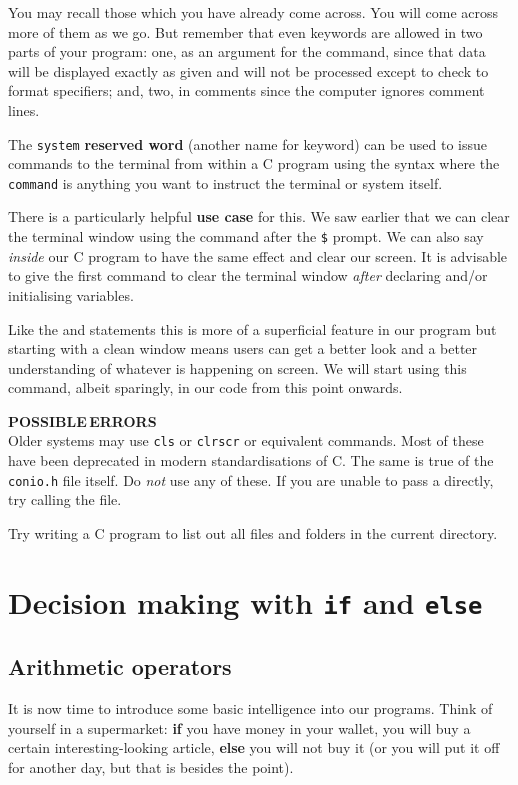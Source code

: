 \documentclass[11pt,oneside]{article}
\newcommand{\eb}[1]{\textbf{\scriptsize{\sffamily\addfontfeatures{LetterSpace=7} #1\\[.35em]}}}
\begin{document}
{{{{{{{You may recall those which you have already come across. You will come across more of them as we go. But remember that even keywords are allowed in two parts of your program: one, as an argument for the  command, since that data will be displayed exactly as given and will not be processed except to check to format specifiers; and, two, in comments since the computer ignores comment lines.

The \verb+system+ \textbf{reserved word} (another name for keyword) can be used to issue commands to the terminal from within a C program using the syntax  where the \verb+command+ is anything you want to instruct the terminal or system itself.

There is a particularly helpful \textbf{use case} for this. We saw earlier that we can clear the terminal window using the  command after the \verb+$+ prompt. We can also say  \textit{inside} our C program to have the same effect and clear our screen. It is advisable to give the first command to clear the terminal window \textit{after} declaring and/or initialising variables.

Like the \cbox{\n} and \cbox{\t} statements this is more of a superficial feature in our program but starting with a clean window means users can get a better look and a better understanding of whatever is happening on screen. We will start using this command, albeit sparingly, in our code from this point onwards.

\begin{errorbox}
\eb{POSSIBLE\;\,ERRORS }
Older systems may use \verb+cls+ or \verb+clrscr+ or equivalent commands. Most of these have been deprecated in modern standardisations of C. The same is true of the \verb+conio.h+ file itself. Do \textit{not} use any of these. If you are unable to pass a  directly, try calling the  file.
\end{errorbox}

 Try writing a C program to list out all files and folders in the current directory.

\section{Decision making with \texttt{\large \lowercase{if}} and \texttt{\large \lowercase{else}}}\label{sec:decision-making-with-if-else}
\subsection{Arithmetic operators}\label{sec:arithmetic-operators}
It is now time to introduce some basic intelligence into our programs. Think of yourself in a supermarket: \textbf{if} you have money in your wallet, you will buy a certain interesting-looking article, \textbf{else} you will not buy it (or you will put it off for another day, but that is besides the point).

}}}}}}}
\end{document}
